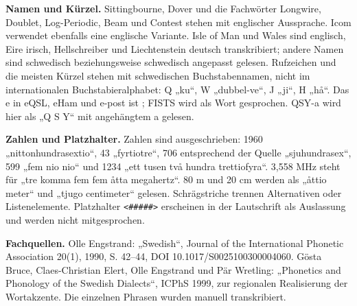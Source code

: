 \documentclass[a4paper,landscape,10pt]{article}
\newcommand{\ipa}[1]{{\ipafont[#1]}}
\begin{document}
\smallskip
\textbf{Namen und Kürzel.} Sittingbourne, Dover und die Fachwörter Longwire, Doublet, Log-Periodic,
Beam und Contest stehen mit englischer Aussprache. Icom verwendet ebenfalls eine englische Variante.
Isle of Man und Wales sind englisch, Eire irisch, Hellschreiber und Liechtenstein deutsch transkribiert;
andere Namen sind schwedisch beziehungsweise schwedisch angepasst gelesen. Rufzeichen und die meisten Kürzel stehen mit schwedischen Buchstabennamen,
nicht im internationalen Buchstabieralphabet: Q „ku“, W „dubbel-ve“, J „ji“, H „hå“.
Das e in eQSL, eHam und e-post ist \ipa{iː}; FISTS wird als Wort gesprochen.
QSY-a wird hier als „Q S Y“ mit angehängtem a gelesen.

\smallskip
\textbf{Zahlen und Platzhalter.} Zahlen sind ausgeschrieben: 1960 „nittonhundrasextio“,
43 „fyrtiotre“, 706 entsprechend der Quelle „sjuhundrasex“, 599 „fem nio nio“ und
1234 „ett tusen två hundra trettiofyra“. 3,558 MHz steht für „tre komma fem fem åtta megahertz“.
80 m und 20 cm werden als „åttio meter“ und „tjugo centimeter“ gelesen.
Schrägstriche trennen Alternativen oder Listenelemente. Platzhalter \texttt{<\#\#\#\#\#>}
erscheinen in der Lautschrift als Auslassung und werden nicht mitgesprochen.

\smallskip
\textbf{Fachquellen.} Olle Engstrand: „Swedish“, Journal of the International Phonetic Association
20(1), 1990, S. 42--44, DOI 10.1017/S0025100300004060.
Gösta Bruce, Claes-Christian Elert, Olle Engstrand und Pär Wretling: „Phonetics and Phonology of the
Swedish Dialects“, ICPhS 1999, zur regionalen Realisierung der Wortakzente.
Die einzelnen Phrasen wurden manuell transkribiert.
\end{document}
